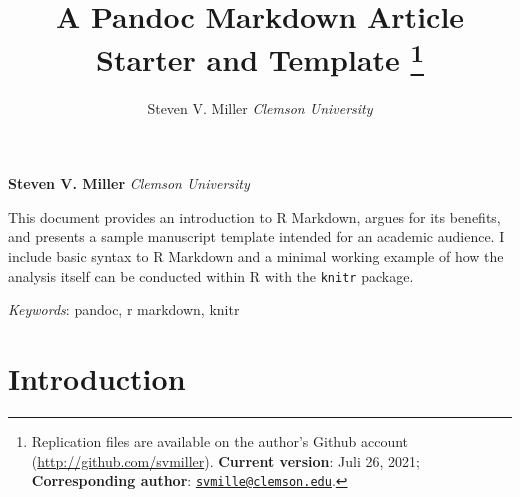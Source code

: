 \documentclass[11pt,]{article}
\title{A Pandoc Markdown Article Starter and Template \thanks{Replication files are available on the author's Github account
(\url{http://github.com/svmiller}). \textbf{Current version}: Juli 26,
2021; \textbf{Corresponding author}:
\href{mailto:svmille@clemson.edu}{\nolinkurl{svmille@clemson.edu}}.}  }
\author{\Large Steven V. Miller\vspace{0.05in} \newline\normalsize\emph{Clemson University}  }
\date{}
\newcommand*{\authorfont}{\fontfamily{phv}\selectfont}
\renewenvironment{abstract}
 {{%
    \setlength{\leftmargin}{0mm}
    \setlength{\rightmargin}{\leftmargin}%
  }%
  \relax}
 {\endlist}
\begin{document}
	
%

{%
\setlength{\parindent}{0pt}
\thispagestyle{plain}
{\fontsize{18}{20}\selectfont\raggedright 
\maketitle  %

}

{
   \vskip 13.5pt\relax \normalsize\fontsize{11}{12} 
\textbf{\authorfont Steven V. Miller} \hskip 15pt \emph{\small Clemson University}   

}

}








\begin{abstract}

    \hbox{\vrule height .2pt width 39.14pc}

    \vskip 8.5pt %

\noindent This document provides an introduction to R Markdown, argues for its
benefits, and presents a sample manuscript template intended for an
academic audience. I include basic syntax to R Markdown and a minimal
working example of how the analysis itself can be conducted within R
with the \texttt{knitr} package.


\vskip 8.5pt \noindent \emph{Keywords}: pandoc, r markdown, knitr \par

    \hbox{\vrule height .2pt width 39.14pc}



\end{abstract}


\vskip -8.5pt



\noindent  

\hypertarget{introduction}{%
\section{Introduction}\label{introduction}}
\end{document}
